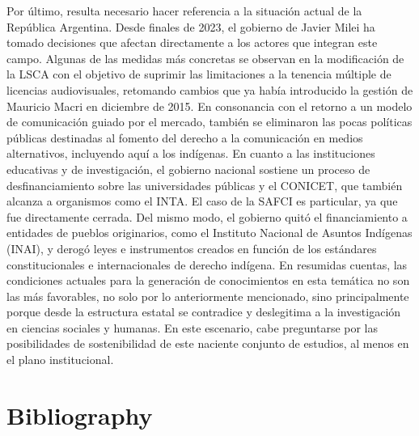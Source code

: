 \documentclass{tufte-handout}
\begin{document}
Por último, resulta necesario hacer referencia a la situación actual de
la República Argentina. Desde finales de 2023, el gobierno de Javier
Milei ha tomado decisiones que afectan directamente a los actores que
integran este campo. Algunas de las medidas más concretas se observan en
la modificación de la LSCA con el objetivo de suprimir las limitaciones
a la tenencia múltiple de licencias audiovisuales, retomando cambios que
ya había introducido la gestión de Mauricio Macri en diciembre de 2015.
En consonancia con el retorno a un modelo de comunicación guiado por el
mercado, también se eliminaron las pocas políticas públicas destinadas
al fomento del derecho a la comunicación en medios alternativos,
incluyendo aquí a los indígenas. En cuanto a las instituciones
educativas y de investigación, el gobierno nacional sostiene un proceso
de desfinanciamiento sobre las universidades públicas y el CONICET, que
también alcanza a organismos como el INTA. El caso de la SAFCI es
particular, ya que fue directamente cerrada. Del mismo modo, el gobierno
quitó el financiamiento a entidades de pueblos originarios, como el
Instituto Nacional de Asuntos Indígenas (INAI), y derogó leyes e
instrumentos creados en función de los estándares constitucionales e
internacionales de derecho indígena. En resumidas cuentas, las
condiciones actuales para la generación de conocimientos en esta
temática no son las más favorables, no solo por lo anteriormente
mencionado, sino principalmente porque desde la estructura estatal se
contradice y deslegitima a la investigación en ciencias sociales y
humanas. En este escenario, cabe preguntarse por las posibilidades de
sostenibilidad de este naciente conjunto de estudios, al menos en el
plano institucional.




\section{Bibliography}\label{bibliography}
\end{document}
